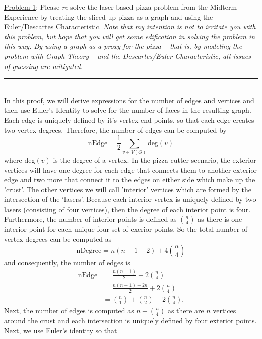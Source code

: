 \documentclass{article}
\newcommand{\statementsep}{\leavevmode\\[0.005in] \rule[\baselineskip/4]{\textwidth}{0.4pt}\leavevmode\\[0.005in]}
\begin{document}
\noindent\underline{Problem 1}: Please \emph{re}-solve the laser-based pizza problem from the Midterm 
Experience by treating the sliced up pizza as a graph and using the Euler/Descartes
Characteristic.
\emph{Note that my intention is not to irritate you with this problem, but hope 
that you will get some edification in solving the problem in this way.
By using a graph as a proxy for the pizza -- that is, by modeling the problem with 
Graph Theory --  and the Descartes/Euler Characteristic, all issues of guessing are
mitigated.}
\statementsep
In this proof, we will derive expressions for the number of edges and vertices and then use Euler's Identity to solve for the number of faces in the resulting graph. \\
Each edge is uniquely defined by it's vertex end points, so that each edge creates two vertex degrees. Therefore, the number of edges can be computed by
\begin{equation*}
	\text{nEdge} = \frac{1}{2}\sum_{v \in V(G)} \text{deg}(v)
\end{equation*}
where deg$(v)$ is the degree of a vertex. In the pizza cutter scenario, the exterior vertices will have one degree for each edge that connects them to another exterior edge and two more that connect it to the edges on either side which make up the 'crust'. The other vertices we will call 'interior' vertices which are formed by the intersection of the `lasers'. Because each interior vertex is uniquely defined by two lasers (consisting of four vertices), then the degree of each interior point is four. Furthermore, the number of interior points is defined as ${n \choose 4}$ as there is one interior point for each unique four-set of exerior points. So the total number of vertex degrees can be computed as
\begin{equation*}
	\text{nDegree} = n(n - 1 + 2) + 4{n \choose 4}
\end{equation*}
and consequently, the number of edges is 
\begin{equation*}\begin{aligned}
	\text{nEdge} &= \frac{n(n + 1)}{2} + 2{n\choose 4} \\
			     &= \frac{n(n - 1) + 2n}{2} + 2{n\choose 4} \\
				 &= {n \choose 1} + {n \choose 2} + 2 {n\choose 4}.
\end{aligned}\end{equation*}
Next, the number of edges is computed as $n + {n \choose 4}$ as there are $n$ vertices around the crust and each intersection is uniquely defined by four exterior points. Next, we use Euler's identity so that
\end{document}
